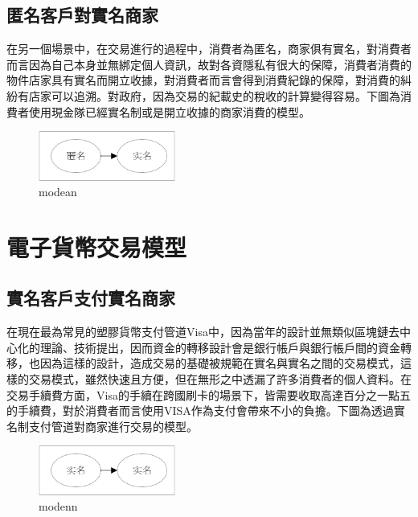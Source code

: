 
		\subsection{匿名客戶對實名商家}
		在另一個場景中，在交易進行的過程中，消費者為匿名，商家俱有實名，對消費者而言因為自己本身並無綁定個人資訊，故對各資隱私有很大的保障，消費者消費的物件店家具有實名而開立收據，對消費者而言會得到消費紀錄的保障，對消費的糾紛有店家可以追溯。對政府，因為交易的紀載史的稅收的計算變得容易。下圖為消費者使用現金隊已經實名制或是開立收據的商家消費的模型。

		\begin{figure}[h]
			\centering
			\includegraphics[width = 0.4\textwidth]{modean.png}
			\caption{modean}\label{modean}
		\end{figure}


	\section{電子貨幣交易模型}
		\subsection{實名客戶支付實名商家}
		在現在最為常見的塑膠貨幣支付管道Visa中，因為當年的設計並無類似區塊鏈去中心化的理論、技術提出，因而資金的轉移設計會是銀行帳戶與銀行帳戶間的資金轉移，也因為這樣的設計，造成交易的基礎被規範在實名與實名之間的交易模式，這樣的交易模式，雖然快速且方便，但在無形之中透漏了許多消費者的個人資料。在交易手續費方面，Visa的手續在跨國刷卡的場景下，皆需要收取高達百分之一點五的手續費，對於消費者而言使用VISA作為支付會帶來不小的負擔。下圖為透過實名制支付管道對商家進行交易的模型。

		\begin{figure}[h]
			\centering
			\includegraphics[width = 0.4\textwidth]{modenn.png}
			\caption{modenn}\label{modenn}
		\end{figure}



